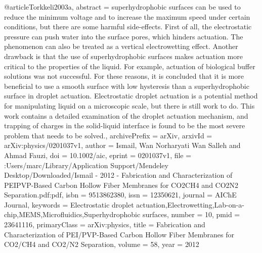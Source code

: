 @article{Torkkeli2003a,
abstract = {superhydrophobic surfaces can be used to reduce the minimum voltage and to increase the maximum speed under certain conditions, but there are some harmful side-effects. First of all, the electrostatic pressure can push water into the surface pores, which hinders actuation. The phenomenon can also be treated as a vertical electrowetting effect. Another drawback is that the use of superhydrophobic surfaces makes actuation more critical to the properties of the liquid. For example, actuation of biological buffer solutions was not successful. For these reasons, it is concluded that it is more beneficial to use a smooth surface with low hysteresis than a superhydrophobic surface in droplet actuation. Electrostatic droplet actuation is a potential method for manipulating liquid on a microscopic scale, but there is still work to do. This work contains a detailed examination of the droplet actuation mechanism, and trapping of charges in the solid-liquid interface is found to be the most severe problem that needs to be solved.},
archivePrefix = {arXiv},
arxivId = {arXiv:physics/0201037v1},
author = {Ismail, Wan Norharyati Wan Salleh and Ahmad Fauzi},
doi = {10.1002/aic},
eprint = {0201037v1},
file = {:Users/marc/Library/Application Support/Mendeley Desktop/Downloaded/Ismail - 2012 - Fabrication and Characterization of PEIPVP-Based Carbon Hollow Fiber Membranes for CO2CH4 and CO2N2 Separation.pdf:pdf},
isbn = {9513862380},
issn = {12350621},
journal = {AIChE Journal},
keywords = {Electrostatic droplet actuation,Electrowetting,Lab-on-a-chip,MEMS,Microfluidics,Superhydrophobic surfaces},
number = {10},
pmid = {23641116},
primaryClass = {arXiv:physics},
title = {{Fabrication and Characterization of PEI/PVP-Based Carbon Hollow Fiber Membranes for CO2/CH4 and CO2/N2 Separation}},
volume = {58},
year = {2012}
}
